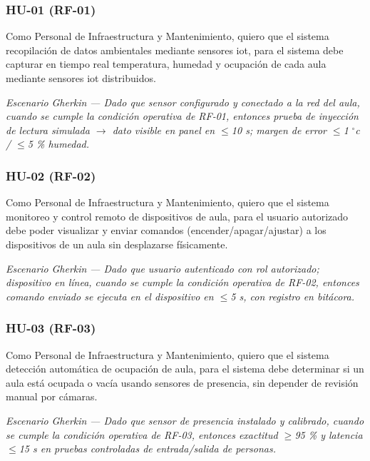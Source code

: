 \subsubsection*{HU-01 (RF-01)}


Como Personal de Infraestructura y Mantenimiento, quiero que el sistema recopilación de datos ambientales mediante sensores iot, para el sistema debe capturar en tiempo real temperatura, humedad y ocupación de cada aula mediante sensores iot distribuidos.


\textit{Escenario }\textit{Gherkin}\textit{ --- Dado que sensor configurado y conectado a la red del aula, cuando se cumple la condición operativa de RF-01, entonces prueba de inyección de lectura simulada $\rightarrow$ dato visible en panel en $\leq$10 s; margen de error $\leq$1 }\textit{$^{\circ}$c}\textit{ / $\leq$5 \% humedad.}


\subsubsection*{HU-02 (RF-02)}


Como Personal de Infraestructura y Mantenimiento, quiero que el sistema monitoreo y control remoto de dispositivos de aula, para el usuario autorizado debe poder visualizar y enviar comandos (encender/apagar/ajustar) a los dispositivos de un aula sin desplazarse físicamente.


\textit{Escenario }\textit{Gherkin}\textit{ --- Dado que usuario autenticado con rol autorizado; dispositivo en línea, cuando se cumple la condición operativa de RF-02, entonces comando enviado se ejecuta en el dispositivo en $\leq$5 s, con registro en bitácora.}


\subsubsection*{HU-03 (RF-03)}


Como Personal de Infraestructura y Mantenimiento, quiero que el sistema detección automática de ocupación de aula, para el sistema debe determinar si un aula está ocupada o vacía usando sensores de presencia, sin depender de revisión manual por cámaras.


\textit{Escenario }\textit{Gherkin}\textit{ --- Dado que sensor de presencia instalado y calibrado, cuando se cumple la condición operativa de RF-03, entonces exactitud $\geq$95 \% y latencia $\leq$15 s en pruebas controladas de entrada/salida de personas.}



